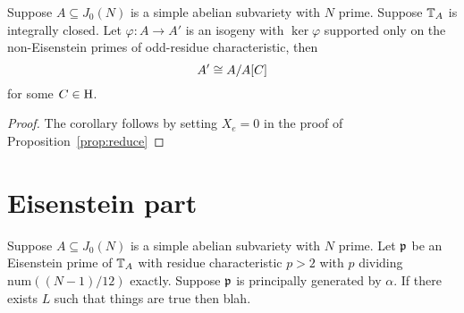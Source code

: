 \documentclass[thesis.tex]{subfiles}
\begin{document}
\begin{corollary}
    Suppose $A\subseteq J_0(N)$ is a simple abelian subvariety with $N$ prime.
    Suppose $\mathbb{T}_A$ is integrally closed. Let $\varphi:A\to A'$ is an isogeny
    with $\ker\varphi$ supported only on the non-Eisenstein primes of
    odd-residue characteristic, then
    \[
        A' \cong A/A[C]
    \]
    for some $C\in \operatorname{H}$.
\end{corollary}
\begin{proof}
    The corollary follows by setting $X_e=0$ in the proof of
    Proposition~\ref{prop:reduce}
\end{proof}

\section{Eisenstein part}%
\label{sec:eisenstein_part}

\begin{corollary}
    Suppose $A\subseteq J_0(N)$ is a simple abelian subvariety with $N$ prime.
    Let $\mathfrak{p}$ be an Eisenstein prime of $\mathbb{T}_A$ with residue characteristic
    $p>2$ with $p$ dividing $\mathrm{num}((N-1)/12)$ exactly. Suppose $\mathfrak{p}$ is
    principally generated by $\alpha$. If there exists $L$ such that things are
    true then blah.
\end{corollary}
\end{document}

